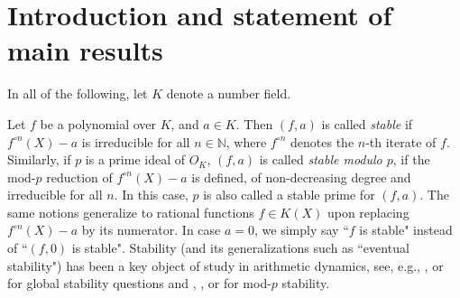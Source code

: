\documentclass[a4paper]{amsart}
\begin{document}
\section{Introduction and statement of main results}
\label{sec:intro}

  In all of the following, let $K$ denote a number field.
  
  Let $f$ be a polynomial over $K$, and $a\in K$. Then $(f,a)$ is called {\it stable} if $f^{\circ n}(X)-a$ is irreducible for all $n\in \mathbb{N}$, where $f^{\circ n}$ denotes the $n$-th iterate of $f$. Similarly, if $p$ is a prime ideal of $O_K$, $(f,a)$ is called {\it stable modulo $p$}, if the mod-$p$ reduction of $f^{\circ n}(X)-a$ is defined, of non-decreasing degree and irreducible for all $n$. In this case, $p$ is also called a stable prime for $(f,a)$.  The same notions generalize to rational functions $f\in K(X)$ upon replacing $f^{\circ n}(X)-a$ by its numerator. In case $a=0$, we simply say ``$f$ is stable" instead of ``$(f,0)$ is stable".
  Stability (and its generalizations such as ``eventual stability") has been a key object of study in arithmetic dynamics, see, e.g., \cite{JL}, \cite{DHJMSS} or \cite{LSS} for global stability questions and \cite{BJ}, \cite{Jones}, \cite{Ferr} or \cite{MOS} for mod-$p$ stability.
  
\end{document}

